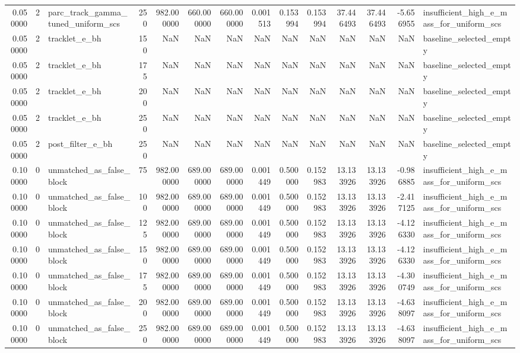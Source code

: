 \begin{tabular}{rrlrrrrrrrrrrl}
0.050000 & 2 & parc_track_gamma_tuned_uniform_scs & 250 & 982.000000 & 660.000000 & 660.000000 & 0.001513 & 0.153994 & 0.153994 & 37.446493 & 37.446493 & -5.656955 & insufficient_high_e_mass_for_uniform_scs \\
0.050000 & 2 & tracklet_e_bh & 150 & NaN & NaN & NaN & NaN & NaN & NaN & NaN & NaN & NaN & baseline_selected_empty \\
0.050000 & 2 & tracklet_e_bh & 175 & NaN & NaN & NaN & NaN & NaN & NaN & NaN & NaN & NaN & baseline_selected_empty \\
0.050000 & 2 & tracklet_e_bh & 200 & NaN & NaN & NaN & NaN & NaN & NaN & NaN & NaN & NaN & baseline_selected_empty \\
0.050000 & 2 & tracklet_e_bh & 250 & NaN & NaN & NaN & NaN & NaN & NaN & NaN & NaN & NaN & baseline_selected_empty \\
0.050000 & 2 & post_filter_e_bh & 250 & NaN & NaN & NaN & NaN & NaN & NaN & NaN & NaN & NaN & baseline_selected_empty \\
0.100000 & 0 & unmatched_as_false_block & 75 & 982.000000 & 689.000000 & 689.000000 & 0.001449 & 0.500000 & 0.152983 & 13.133926 & 13.133926 & -0.986885 & insufficient_high_e_mass_for_uniform_scs \\
0.100000 & 0 & unmatched_as_false_block & 100 & 982.000000 & 689.000000 & 689.000000 & 0.001449 & 0.500000 & 0.152983 & 13.133926 & 13.133926 & -2.417125 & insufficient_high_e_mass_for_uniform_scs \\
0.100000 & 0 & unmatched_as_false_block & 125 & 982.000000 & 689.000000 & 689.000000 & 0.001449 & 0.500000 & 0.152983 & 13.133926 & 13.133926 & -4.126330 & insufficient_high_e_mass_for_uniform_scs \\
0.100000 & 0 & unmatched_as_false_block & 150 & 982.000000 & 689.000000 & 689.000000 & 0.001449 & 0.500000 & 0.152983 & 13.133926 & 13.133926 & -4.126330 & insufficient_high_e_mass_for_uniform_scs \\
0.100000 & 0 & unmatched_as_false_block & 175 & 982.000000 & 689.000000 & 689.000000 & 0.001449 & 0.500000 & 0.152983 & 13.133926 & 13.133926 & -4.300749 & insufficient_high_e_mass_for_uniform_scs \\
0.100000 & 0 & unmatched_as_false_block & 200 & 982.000000 & 689.000000 & 689.000000 & 0.001449 & 0.500000 & 0.152983 & 13.133926 & 13.133926 & -4.638097 & insufficient_high_e_mass_for_uniform_scs \\
0.100000 & 0 & unmatched_as_false_block & 250 & 982.000000 & 689.000000 & 689.000000 & 0.001449 & 0.500000 & 0.152983 & 13.133926 & 13.133926 & -4.638097 & insufficient_high_e_mass_for_uniform_scs \\

\end{tabular}
